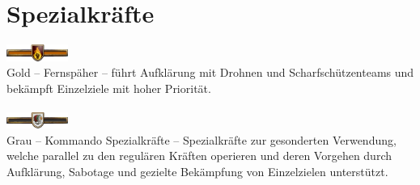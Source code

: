 \section{Spezialkräfte}
\includegraphics[width=20mm]{./img/truppenordnung/spezialeinheiten/TrGold}\\
Gold -- Fernspäher -- führt Aufklärung mit Drohnen und Scharfschützenteams und bekämpft Einzelziele mit hoher Priorität.\\\\
\includegraphics[width=20mm]{./img/truppenordnung/spezialeinheiten/TrGrau}\\
Grau -- Kommando Spezialkräfte -- Spezialkräfte zur gesonderten Verwendung, welche parallel zu den regulären Kräften operieren und deren Vorgehen durch Aufklärung, Sabotage und gezielte Bekämpfung von Einzelzielen unterstützt.
